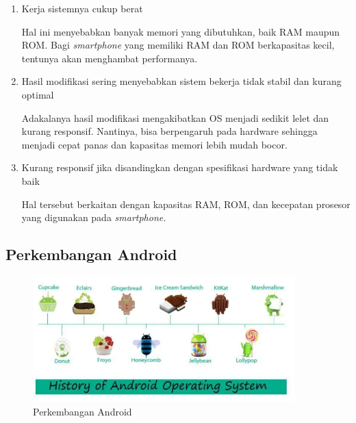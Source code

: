 \begin{enumerate}
    \item  Kerja sistemnya cukup berat
    \par Hal ini menyebabkan banyak memori yang dibutuhkan, baik RAM maupun ROM. Bagi \textit{smartphone} yang memiliki RAM dan ROM berkapasitas kecil, tentunya akan menghambat performanya.
    \item Hasil modifikasi sering menyebabkan sistem bekerja tidak stabil dan kurang optimal
    \par Adakalanya hasil modifikasi mengakibatkan OS menjadi sedikit lelet dan kurang responsif. Nantinya, bisa berpengaruh pada hardware sehingga menjadi cepat panas dan kapasitas memori lebih mudah bocor.
    \item Kurang responsif jika disandingkan dengan spesifikasi hardware yang tidak baik
    \par Hal tersebut berkaitan dengan kapasitas RAM, ROM, dan kecepatan prosesor yang digunakan pada \textit{smartphone.}
\end{enumerate}
\subsection{Perkembangan Android}
    \begin{figure}[H]
    \centering
    \includegraphics[width=0.9\textwidth]{figures/android2.png}
    \caption{Perkembangan Android}
    \label{print}
    \end{figure}

